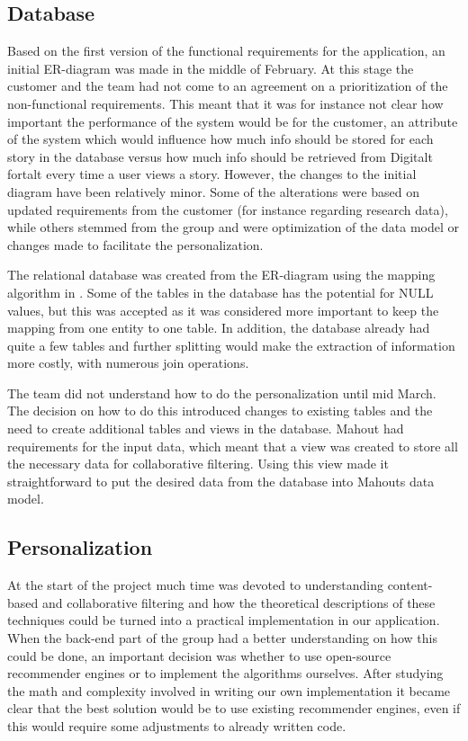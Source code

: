 \subsection{Database}

Based on the first version of the functional requirements for the application, an initial ER-diagram was made in the middle of February. At this stage the customer and the team had not come to an agreement on a prioritization of the non-functional requirements. This meant that it was for instance not clear how important the performance of the system would be for the customer, an attribute of the system which would influence how much info should be stored for each story in the database versus how much info should be retrieved from Digitalt fortalt every time a user views a story. However, the changes to the initial diagram have been relatively minor. Some of the alterations were based on updated requirements from the customer (for instance regarding research data), while others stemmed from the group and were optimization of the data model or changes made to facilitate the personalization.\newline

The relational database was created from the ER-diagram using the mapping algorithm in \cite[p.270-278]{AS2}. Some of the tables in the database has the potential for NULL values, but this was accepted as it was considered more important to keep the mapping from one entity to one table. In addition, the database already had quite a few tables and further splitting would make the extraction of information more costly, with numerous join operations. \newline 

The team did not understand how to do the personalization until mid March. The decision on how to do this introduced changes to existing tables and the need to create additional tables and views in the database. Mahout had requirements for the input data, which meant that a view was created to store all the necessary data for collaborative filtering. Using this view made it straightforward to put the desired data from the database into Mahouts data model.

\subsection{Personalization}

At the start of the project much time was devoted to understanding content-based and collaborative filtering and how the theoretical descriptions of these techniques could be turned into a practical implementation in our application. When the back-end part of the group had a better understanding on how this could be done, an important decision was whether to use open-source recommender engines or to implement the algorithms ourselves. After studying the math and complexity involved in writing our own implementation it became clear that the best solution would be to use existing recommender engines, even if this would require some adjustments to already written code. \newline

